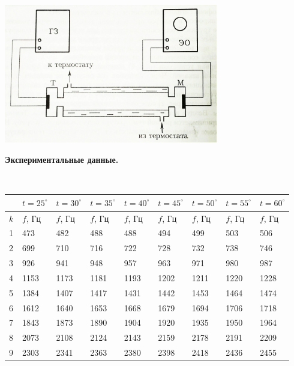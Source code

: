 \documentclass[12pt]{article}
\begin{document}
\begin{center}\includegraphics[width=0.7\textwidth]{2131.jpg}\end{center}
\newpage
\textbf{Экспериментальные данные.}

~

\noindent\begin{tabular}{ |l|l|l|l|l|l|l|l|l| }
  \hline
  ~ & $t = 25^\circ$ & $t = 30^\circ$ & $t = 35^\circ$ & $t = 40^\circ$ & $t = 45^\circ$ & $t = 50^\circ$ & $t = 55^\circ$ & $t = 60^\circ$ \\
  \hline
$k$ & $f$, Гц & $f$, Гц & $f$, Гц & $f$, Гц & $f$, Гц & $f$, Гц & $f$, Гц & $f$, Гц \\
\hline
1 & 473 & 482 & 488 & 488 & 494 & 499 & 503 & 506 \\
2 & 699 & 710 & 716 & 722 & 728 & 732 & 738 & 746 \\
3 & 926 & 941 & 948 & 957 & 963 & 971 & 980 & 987 \\
4 & 1153 & 1173 & 1181 & 1193 & 1202 & 1211 & 1220 & 1228 \\
5 & 1384 & 1407 & 1417 & 1431 & 1442 & 1453 & 1464 & 1474 \\
6 & 1612 & 1640 & 1653 & 1668 & 1679 & 1694 & 1706 & 1718 \\
7 & 1843 & 1873 & 1890 & 1904 & 1920 & 1935 & 1950 & 1964 \\
8 & 2073 & 2108 & 2124 & 2143 & 2159 & 2178 & 2191 & 2209 \\
9 & 2303 & 2341 & 2363 & 2380 & 2398 & 2418 & 2436 & 2455 \\
\hline
\end{tabular}

~
\end{document}
